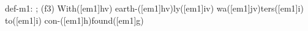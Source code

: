 def-m1: \grealign;
(f3) With([em1]hv) earth-([em1]hv)ly([em1]iv) wa([em1]jv)ters([em1]i) to([em1]i) con-([em1]h)found([em1]g)